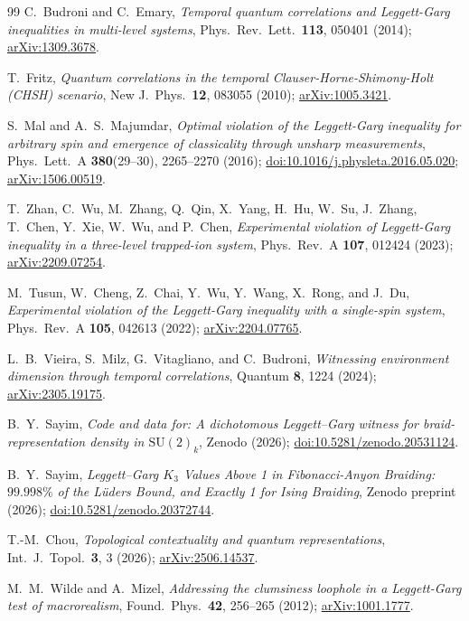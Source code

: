\documentclass[aps,prx,reprint,amsmath,amssymb,floatfix,nofootinbib,superscriptaddress]{revtex4-2}
\begin{document}
\begin{thebibliography}{99}
C.~Budroni and C.~Emary,
\emph{Temporal quantum correlations and Leggett-Garg inequalities in multi-level systems},
Phys.\ Rev.\ Lett.\ \textbf{113}, 050401 (2014);
\href{https://arxiv.org/abs/1309.3678}{arXiv:1309.3678}.

T.~Fritz,
\emph{Quantum correlations in the temporal Clauser-Horne-Shimony-Holt (CHSH) scenario},
New J.\ Phys.\ \textbf{12}, 083055 (2010);
\href{https://arxiv.org/abs/1005.3421}{arXiv:1005.3421}.

S.~Mal and A.~S.~Majumdar,
\emph{Optimal violation of the Leggett-Garg inequality for arbitrary spin and emergence of classicality through unsharp measurements},
Phys.\ Lett.\ A \textbf{380}(29--30), 2265--2270 (2016);
\href{https://doi.org/10.1016/j.physleta.2016.05.020}{doi:10.1016/j.physleta.2016.05.020};
\href{https://arxiv.org/abs/1506.00519}{arXiv:1506.00519}.

T.~Zhan, C.~Wu, M.~Zhang, Q.~Qin, X.~Yang, H.~Hu, W.~Su, J.~Zhang, T.~Chen, Y.~Xie, W.~Wu, and P.~Chen,
\emph{Experimental violation of Leggett-Garg inequality in a three-level trapped-ion system},
Phys.\ Rev.\ A \textbf{107}, 012424 (2023);
\href{https://arxiv.org/abs/2209.07254}{arXiv:2209.07254}.

M.~Tusun, W.~Cheng, Z.~Chai, Y.~Wu, Y.~Wang, X.~Rong, and J.~Du,
\emph{Experimental violation of the Leggett-Garg inequality with a single-spin system},
Phys.\ Rev.\ A \textbf{105}, 042613 (2022);
\href{https://arxiv.org/abs/2204.07765}{arXiv:2204.07765}.

L.~B.~Vieira, S.~Milz, G.~Vitagliano, and C.~Budroni,
\emph{Witnessing environment dimension through temporal correlations},
Quantum \textbf{8}, 1224 (2024);
\href{https://arxiv.org/abs/2305.19175}{arXiv:2305.19175}.

B.~Y.~Sayim,
\emph{Code and data for: A dichotomous Leggett--Garg witness for
braid-representation density in $\mathrm{SU}(2)_k$},
Zenodo (2026);
\href{https://doi.org/10.5281/zenodo.20531124}{doi:10.5281/zenodo.20531124}.

B.~Y.~Sayim,
\emph{Leggett--Garg $K_{3}$ Values Above 1 in Fibonacci-Anyon Braiding:
$99.998\%$ of the L\"uders Bound, and Exactly 1 for Ising Braiding},
Zenodo preprint (2026);
\href{https://doi.org/10.5281/zenodo.20372744}{doi:10.5281/zenodo.20372744}.

T.-M.~Chou,
\emph{Topological contextuality and quantum representations},
Int.\ J.\ Topol.\ \textbf{3}, 3 (2026);
\href{https://arxiv.org/abs/2506.14537}{arXiv:2506.14537}.

M.~M.~Wilde and A.~Mizel,
\emph{Addressing the clumsiness loophole in a Leggett-Garg test of macrorealism},
Found.\ Phys.\ \textbf{42}, 256--265 (2012);
\href{https://arxiv.org/abs/1001.1777}{arXiv:1001.1777}.

\end{thebibliography}
\end{document}

